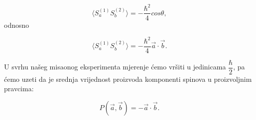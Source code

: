 \begin{equation}
    \langle  S_a^{(1)}S_b^{(2)} \rangle = -\frac{\hbar^2}{4}cos{\theta},
\end{equation}
odnosno

\begin{equation}
    \langle  S_a^{(1)}S_b^{(2)} \rangle = -\frac{\hbar^2}{4} \vec{a} \cdot \vec{b}.
\end{equation}

U svrhu našeg misaonog eksperimenta mjerenje ćemo vršiti u jedinicama $\dfrac{\hbar}{2}$, pa ćemo uzeti da je srednja vrijednost proizvoda komponenti spinova u proizvoljnim pravcima:

\begin{equation}
    P(\vec{a}, \vec{b}) = - \vec{a} \cdot \vec{b}.
\end{equation}